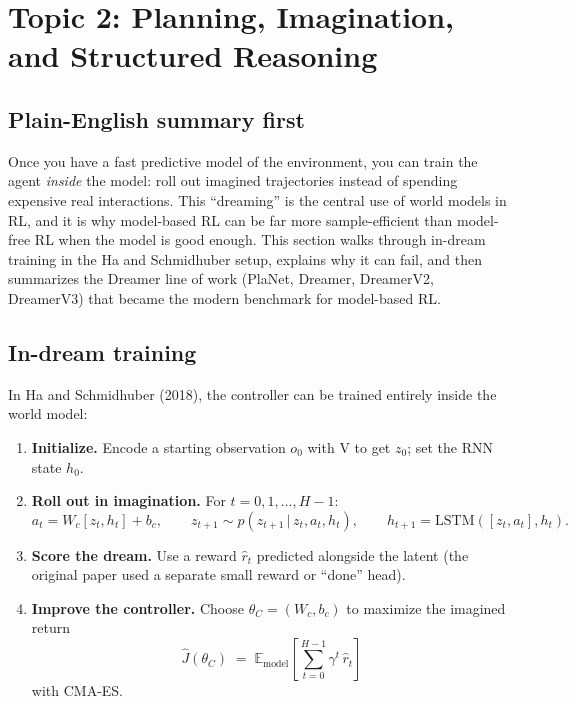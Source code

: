 \documentclass[11pt]{article}
\newcommand{\E}{\mathbb{E}}
\newcommand{\given}{\,\vert\,}
\theoremstyle{remark}
\begin{document}
\section{Topic 2: Planning, Imagination, and Structured Reasoning}

\subsection*{Plain-English summary first}

Once you have a fast predictive model of the environment, you can train the agent \emph{inside} the model: roll out imagined trajectories instead of spending expensive real interactions. This ``dreaming'' is the central use of world models in RL, and it is why model-based RL can be far more sample-efficient than model-free RL when the model is good enough. This section walks through in-dream training in the Ha and Schmidhuber setup, explains why it can fail, and then summarizes the Dreamer line of work (PlaNet, Dreamer, DreamerV2, DreamerV3) that became the modern benchmark for model-based RL.

\subsection{In-dream training}

In Ha and Schmidhuber (2018), the controller can be trained entirely inside the world model:

\begin{enumerate}[leftmargin=1.6em]
  \item \textbf{Initialize.} Encode a starting observation $o_0$ with V to get $z_0$; set the RNN state $h_0$.
  \item \textbf{Roll out in imagination.} For $t = 0, 1, \dots, H-1$:
  \begin{equation}
    a_t = W_c[z_t, h_t] + b_c, \qquad
    z_{t+1} \sim p(z_{t+1} \given z_t, a_t, h_t), \qquad
    h_{t+1} = \mathrm{LSTM}([z_t, a_t], h_t).
    \label{eq:imagine}
  \end{equation}
  \item \textbf{Score the dream.} Use a reward $\hat r_t$ predicted alongside the latent (the original paper used a separate small reward or ``done'' head).
  \item \textbf{Improve the controller.} Choose $\theta_C = (W_c, b_c)$ to maximize the imagined return
  \begin{equation}
    \hat J(\theta_C) \;=\; \E_{\text{model}}\!\left[\sum_{t=0}^{H-1} \gamma^t\, \hat r_t\right]
    \label{eq:imagined-return}
  \end{equation}
  with CMA-ES.
\end{enumerate}
\end{document}
